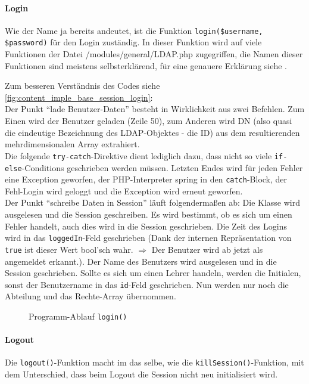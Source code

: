 \paragraph{Login\\}
Wie der Name ja bereits andeutet, ist die Funktion \texttt{login(\$username, \$password)} für den Login zuständig. In dieser Funktion wird auf viele Funktionen der Datei /modules/general/LDAP.php zugegriffen, die Namen dieser Funktionen sind meistens selbsterklärend, für eine genauere Erklärung siehe .

Zum besseren Verständnis des Codes siehe \autoref{fig:content_imple_base_session_login}:\\
Der Punkt \enquote{lade Benutzer-Daten} besteht in Wirklichkeit aus zwei Befehlen. Zum Einen wird der Benutzer geladen (Zeile 50), zum Anderen wird DN (also quasi die eindeutige Bezeichnung des LDAP-Objektes - die ID) aus dem resultierenden mehrdimensionalen Array extrahiert.\\
Die folgende \texttt{try-catch}-Direktive dient lediglich dazu, dass nicht so  viele \texttt{if-else}-Conditions geschrieben werden müssen. Letzten Endes wird für jeden Fehler eine Exception geworfen, der PHP-Interpreter spring in den \texttt{catch}-Block, der Fehl-Login wird geloggt und die Exception wird erneut geworfen.\\
Der Punkt \enquote{schreibe Daten in Session} läuft folgendermaßen ab: Die Klasse wird ausgelesen und die Session geschreiben. Es wird bestimmt, ob es sich um einen Fehler handelt, auch dies wird in die Session geschrieben. Die Zeit des Logins wird in das \texttt{loggedIn}-Feld geschrieben (Dank der internen Repräsentation von \texttt{true} ist dieser Wert bool'sch wahr. $ \Longrightarrow $ Der Benutzer wird ab jetzt als angemeldet erkannt.). Der Name des Benutzers wird ausgelesen und in die Session geschrieben. Sollte es sich um einen Lehrer handeln, werden die Initialen, sonst der Benutzername in das \texttt{id}-Feld geschrieben. Nun werden nur noch die Abteilung und das Rechte-Array übernommen.
\begin{figure}[H]
\centering
\caption{Programm-Ablauf \texttt{login()}}
\label{fig:content_imple_base_session_login}
\end{figure}

\paragraph{Logout\\}
Die \texttt{logout()}-Funktion macht im das selbe, wie die \texttt{killSession()}-Funktion, mit dem Unterschied, dass beim Logout die Session nicht neu initialisiert wird.


%
%
% 
%
